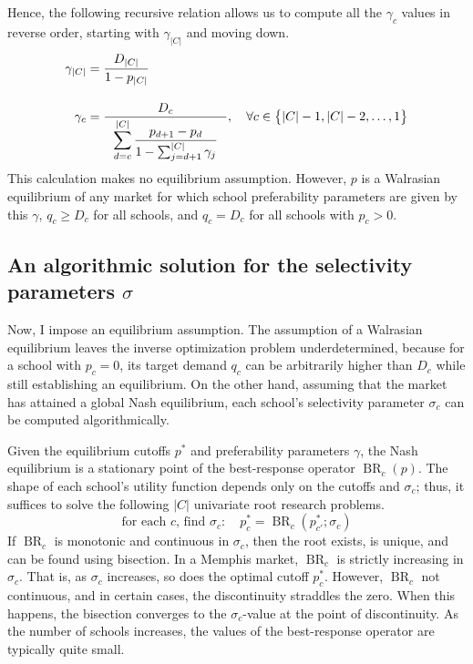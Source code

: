 \documentclass[12pt]{article}
\numberwithin{equation}{subsection}
\theoremstyle{definition}
\begin{document}
Hence, the following recursive relation allows us to compute all the $\gamma_c$ values in reverse order, starting with $\gamma_{|C|}$ and moving down.
\begin{align}
\gamma_{|C|} &= \frac{D_{|C|}}{1 - p_{|C|}} \\[1em]
\gamma_c &= \frac{D_c}{~~\mathlarger{\sum_{d=c}^{|C|} \frac{p_{d+1} - p_d}{1 - \sum_{j=d+1}^{|C|} \gamma_j} ~~}}, \quad \forall c \in \bigl\{ |C|-1, |C|-2, \dots, 1\bigr\} \label{gammarecursion}
\end{align}
This calculation makes no equilibrium assumption. However, $p$ is a Walrasian equilibrium of any market for which school preferability parameters are given by this $\gamma$, $q_c \geq D_c$ for all schools, and $q_c = D_c$ for all schools with $p_c > 0$. 

\subsection{An algorithmic solution for the selectivity parameters $\sigma$}
Now, I impose an equilibrium assumption. The assumption of a Walrasian equilibrium leaves the inverse optimization problem underdetermined, because for a school with $p_c = 0$, its target demand $q_c$ can be arbitrarily higher than $D_c$ while still establishing an equilibrium. On the other hand, assuming that the market has attained a global Nash equilibrium, each school's selectivity parameter $\sigma_c$ can be computed algorithmically. 

Given the equilibrium cutoffs $p^*$ and preferability parameters $\gamma$, the Nash equilibrium is a stationary point of the best-response operator $\operatorname{BR}_c(p)$. The shape of each school's utility function depends only on the cutoffs and $\sigma_c$; thus, it suffices to solve the following $|C|$ univariate root research problems. 
\[\text{for each } c\text{, find } \sigma_c :\quad p^*_c = \operatorname{BR}_c  (p^*_{c'} ; \sigma_c) \]
If $\operatorname{BR}_c$ is monotonic and continuous in $\sigma_c$, then the root exists, is unique, and can be found using bisection. In a Memphis market, $\operatorname{BR}_c$ is strictly increasing in $\sigma_c$. That is, as $\sigma_c$ increases, so does the optimal cutoff $p^*_c$.  However, $\operatorname{BR}_c$ not continuous, and in certain cases, the discontinuity straddles the zero. When this happens, the bisection converges to the $\sigma_c$-value at the point of discontinuity. As the number of schools increases, the values of the best-response operator are typically quite small. 
\end{document}
